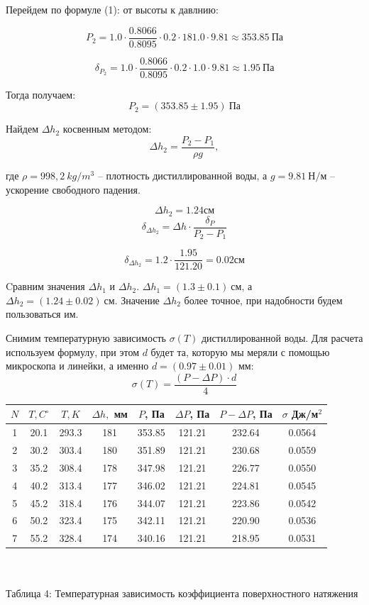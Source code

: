 \documentclass[a4paper,12pt]{article} %
\begin{document}
Перейдем по формуле (1): от высоты к давлнию:

\[P_2 = 1.0\cdot \frac{0.8066}{0.8095}\cdot 0.2\cdot 181.0\cdot 9.81\approx 353.85\ \text{Па}\]

\[\delta_{P_2} = 1.0\cdot \frac{0.8066}{0.8095}\cdot 0.2\cdot 1.0\cdot 9.81\approx 1.95\ \text{Па}\]

Тогда получаем:
\[P_2 = (353.85 \pm 1.95)\ \text{Па}\]

Найдем $\Delta h_2$ косвенным методом:
\[\Delta h_2 = \frac{P_2-P_1}{\rho g},\]

где $\rho = 998,2\ kg/m^3$ -- плотность дистиллированной воды, а $g = 9.81\
 \text{Н/м}$ -- ускорение свободного падения.
 
\[\Delta h_2 = 1.24 \text{см}\]
\[\delta_{\Delta h_2} = \Delta h\cdot \frac{\delta_P}{P_2 - P_1}\]

\[\delta_{\Delta h_2} = 1.2\cdot \frac{1.95}{121.20} = 0.02 см\]

Cравним значения $\Delta h_1$ и $\Delta h_2$. $\Delta h_1 = (1.3 \pm 0.1)\ \text{см}$, а $\Delta h_2 = (1.24 \pm 0.02)\ \text{см}$. Значение $\Delta h_2$ более точное, при надобности будем пользоваться им.

Снимим температурную зависимость $\sigma(T)$ дистиллированной воды. Для расчета используем формулу, при этом $d$ будет та, которую мы меряли с помощью микроскопа и линейки, а именно $d = (0.97 \pm 0.01) $ мм:
\[\sigma(T) = \frac{(P-\Delta P)\cdot d}{4}\]

\begin{tabular}{ | c | c | c | c | c | c | c | c |}
\hline
 $N$ & $T, C^{\circ}$ & $T, K$  & $\Delta h,$ мм & $P$, Па & $\Delta P$, Па & 
 $P - \Delta P$, Па  & $\sigma$ Дж/м$^2$   \\ \hline
1& 20.1 & 293.3 & 181 & 353.85 & 121.21 & 232.64 & 0.0564  \\ \hline
2& 30.2 & 303.4 & 180 & 351.89 & 121.21 & 230.68 & 0.0559  \\ \hline
3& 35.2 & 308.4 & 178 & 347.98 & 121.21 & 226.77 & 0.0550  \\ \hline
4& 40.2 & 313.4 & 177 & 346.02 & 121.21 & 224.81 & 0.0545  \\ \hline
5& 45.2 & 318.4 & 176 & 344.07 & 121.21 & 223.86 & 0.0542  \\ \hline
6& 50.2 & 323.4 & 175 & 342.11 & 121.21 & 220.90 & 0.0536  \\ \hline
7& 55.2 & 328.4 & 174 & 340.16 & 121.21 & 218.95 & 0.0531  \\ \hline
\end{tabular}\\
\setlength{\parskip}{0.3cm}\\
Таблица 4: Температурная зависимость коэффициента поверхностного натяжения
\end{document}
